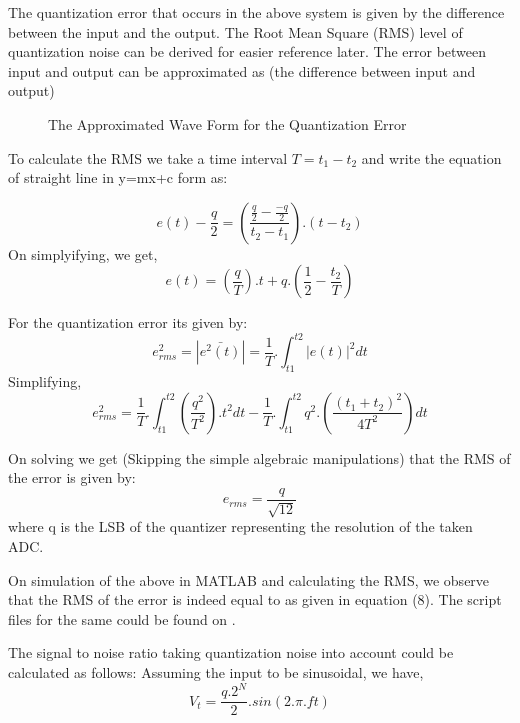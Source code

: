 \documentclass[colorlinks=true,pdfstartview=FitV,linkcolor=blue,
            citecolor=red,urlcolor=magenta]{ligodoc}
\begin{document}
The quantization error that occurs in the above system is given by the difference between the input and the output. The Root Mean Square (RMS) level of quantization noise can be derived for easier reference later.
The error between input and output can be approximated as (the difference between input and output)

 \begin{figure}[htbp]
 
  \centering
  
  \caption{The Approximated Wave Form for the Quantization Error}
 
\end{figure}

To calculate the RMS we take a time interval $T = t_{1}-t_{2}$ and write the equation of straight line in y=mx+c form as:

\begin{equation}
e(t)-\frac{q}{2}=\left(\frac{\frac{q}{2}-\frac{-q}{2}}{t_{2}-t_{1}}\right).(t-t_{2})
\end{equation}
On simplyifying, we get,
\begin{equation}
e(t)=\left(\frac{q}{T}\right).t + q .\left(\frac{1}{2}-\frac{t_{2}}{T}\right)
\end{equation}

For the quantization error its given by: 
\begin{equation}
e_{rms}^{2}=\left|\bar{e^{2}(t)}\right|=\frac{1}{T}.\int_{t1}^{t2} \left|e(t)\right|^{2} dt
\end{equation}
Simplifying,
\begin{equation}
e_{rms}^{2}=\frac{1}{T}.\int_{t1}^{t2} \left(\frac{q^{2}}{T^{2}}\right).t^{2} dt  -\frac{1}{T}.\int_{t1}^{t2} q^{2}.\left(\frac{(t_{1}+t_{2})^{2}}{4T^{2}}\right) dt
\end{equation}

On solving we get (Skipping the simple algebraic manipulations) that the RMS of the error is given by:
\begin{equation}
e_{rms}=\frac{q}{\sqrt{12}}
\end{equation}
where q is the LSB of the quantizer representing the resolution of the taken ADC.

On simulation of the above in MATLAB and calculating the RMS, we observe that the RMS of the error is indeed equal to as given in equation (8). The script files for the same could be found on \cite{Git}.

The signal to noise ratio taking quantization noise into account could be calculated as follows:
Assuming the input to be sinusoidal, we have, 
\begin{equation}
V_{t} = \frac{q. 2^{N}}{2} . sin(2.\pi .ft)
\end{equation}
\end{document}
